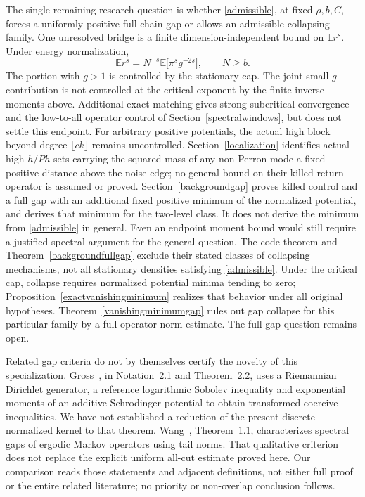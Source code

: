 \documentclass[11pt]{article}
\newcommand{\E}{\mathbb E}
\begin{document}
The single remaining research question is whether \eqref{admissible}, at fixed $\rho,b,C$, forces a uniformly positive full-chain gap or allows an admissible collapsing family. One unresolved bridge is a finite dimension-independent bound on $\E r^s$. Under energy normalization,
\[
 \E r^s=N^{-s}\E\bigl[\pi^s g^{-2s}\bigr],\qquad N\geq b.
\]
The portion with $g>1$ is controlled by the stationary cap. The joint small-$g$ contribution is not controlled at the critical exponent by the finite inverse moments above. Additional exact matching gives strong subcritical convergence and the low-to-all operator control of Section~\ref{spectralwindows}, but does not settle this endpoint. For arbitrary positive potentials, the actual high block beyond degree $\lfloor ck\rfloor$ remains uncontrolled. Section~\ref{localization} identifies actual high-$h/Ph$ sets carrying the squared mass of any non-Perron mode a fixed positive distance above the noise edge; no general bound on their killed return operator is assumed or proved. Section~\ref{backgroundgap} proves killed control and a full gap with an additional fixed positive minimum of the normalized potential, and derives that minimum for the two-level class. It does not derive the minimum from \eqref{admissible} in general. Even an endpoint moment bound would still require a justified spectral argument for the general question. The code theorem and Theorem~\ref{backgroundfullgap} exclude their stated classes of collapsing mechanisms, not all stationary densities satisfying \eqref{admissible}. Under the critical cap, collapse requires normalized potential minima tending to zero; Proposition~\ref{exactvanishingminimum} realizes that behavior under all original hypotheses. Theorem~\ref{vanishingminimumgap} rules out gap collapse for this particular family by a full operator-norm estimate. The full-gap question remains open.

Related gap criteria do not by themselves certify the novelty of this
specialization. Gross~\cite{gross2025}, in Notation~2.1 and Theorem~2.2,
uses a Riemannian Dirichlet generator, a reference logarithmic Sobolev
inequality and exponential moments of an additive Schrodinger potential
to obtain transformed coercive inequalities. We have not established a
reduction of the present discrete normalized kernel to that theorem.
Wang~\cite{wang2013}, Theorem~1.1, characterizes spectral gaps of ergodic
Markov operators using tail norms. That qualitative criterion does not
replace the explicit uniform all-cut estimate proved here. Our comparison
reads those statements and adjacent definitions, not either full proof or
the entire related literature; no priority or non-overlap conclusion follows.
\end{document}
